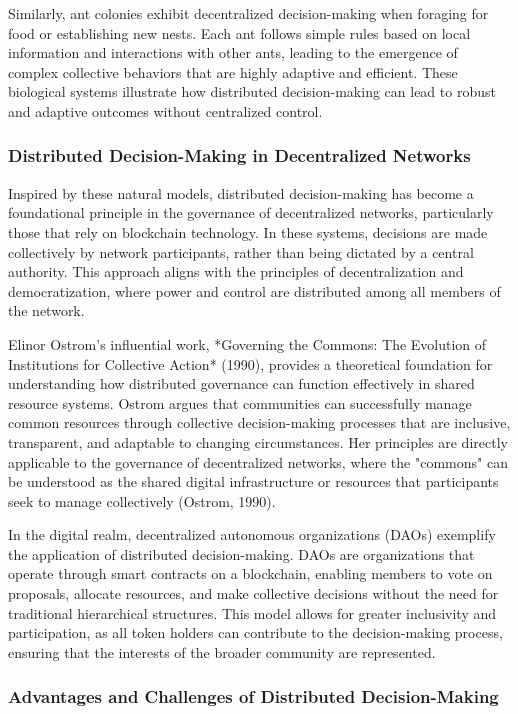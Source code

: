 \documentclass[12pt,twoside]{article}
\begin{document}
Similarly, ant colonies exhibit decentralized decision-making when foraging for food or establishing new nests. Each ant follows simple rules based on local information and interactions with other ants, leading to the emergence of complex collective behaviors that are highly adaptive and efficient. These biological systems illustrate how distributed decision-making can lead to robust and adaptive outcomes without centralized control.

\subsubsection{Distributed Decision-Making in Decentralized Networks}

Inspired by these natural models, distributed decision-making has become a foundational principle in the governance of decentralized networks, particularly those that rely on blockchain technology. In these systems, decisions are made collectively by network participants, rather than being dictated by a central authority. This approach aligns with the principles of decentralization and democratization, where power and control are distributed among all members of the network.

Elinor Ostrom's influential work, *Governing the Commons: The Evolution of Institutions for Collective Action* (1990), provides a theoretical foundation for understanding how distributed governance can function effectively in shared resource systems. Ostrom argues that communities can successfully manage common resources through collective decision-making processes that are inclusive, transparent, and adaptable to changing circumstances. Her principles are directly applicable to the governance of decentralized networks, where the "commons" can be understood as the shared digital infrastructure or resources that participants seek to manage collectively (Ostrom, 1990).

In the digital realm, decentralized autonomous organizations (DAOs) exemplify the application of distributed decision-making. DAOs are organizations that operate through smart contracts on a blockchain, enabling members to vote on proposals, allocate resources, and make collective decisions without the need for traditional hierarchical structures. This model allows for greater inclusivity and participation, as all token holders can contribute to the decision-making process, ensuring that the interests of the broader community are represented.

\subsubsection{Advantages and Challenges of Distributed Decision-Making}
\end{document}
